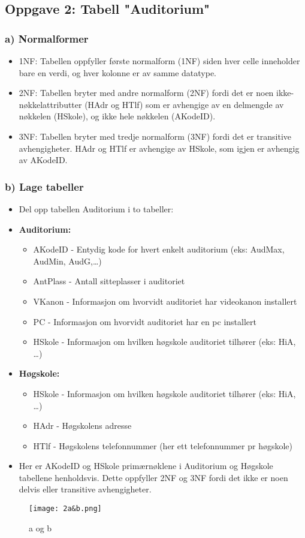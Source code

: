 \documentclass{article}
\begin{document}
\subsection*{Oppgave 2: Tabell "Auditorium"}
\subsubsection*{a) Normalformer}
\begin{itemize}
    \item 1NF: Tabellen oppfyller første normalform (1NF) siden hver celle inneholder bare en verdi, og hver kolonne er av samme datatype.
    \item 2NF: Tabellen bryter med andre normalform (2NF) fordi det er noen ikke-nøkkelattributter (HAdr og HTlf) som er avhengige av en delmengde av nøkkelen (HSkole), og ikke hele nøkkelen (AKodeID).
    \item 3NF: Tabellen bryter med tredje normalform (3NF) fordi det er transitive avhengigheter. HAdr og HTlf er avhengige av HSkole, som igjen er avhengig av AKodeID.
\end{itemize}

\subsubsection*{b) Lage tabeller}
\begin{itemize}
    \item Del opp tabellen Auditorium i to tabeller:
    \item \textbf{Auditorium:}
    \begin{itemize}
        \item AKodeID - Entydig kode for hvert enkelt auditorium (eks: AudMax, AudMin, AudG,…)
        \item AntPlass - Antall sitteplasser i auditoriet
        \item VKanon - Informasjon om hvorvidt auditoriet har videokanon installert
        \item PC - Informasjon om hvorvidt auditoriet har en pc installert
        \item HSkole - Informasjon om hvilken høgskole auditoriet tilhører (eks: HiA, …)
    \end{itemize}
    \item \textbf{Høgskole:}
    \begin{itemize}
        \item HSkole - Informasjon om hvilken høgskole auditoriet tilhører (eks: HiA, …)
        \item HAdr - Høgskolens adresse
        \item HTlf - Høgskolens telefonnummer (her ett telefonnummer pr høgskole)
    \end{itemize}
    \item Her er AKodeID og HSkole primærnøklene i Auditorium og Høgskole tabellene henholdsvis. Dette oppfyller 2NF og 3NF fordi det ikke er noen delvis eller transitive avhengigheter.
\end{itemize}
\begin{figure}[H]
    \centering
    \texttt{[image: 2a\&b.png]}
    \caption{a og b}
    \label{fig:example}
\end{figure}
\end{document}
